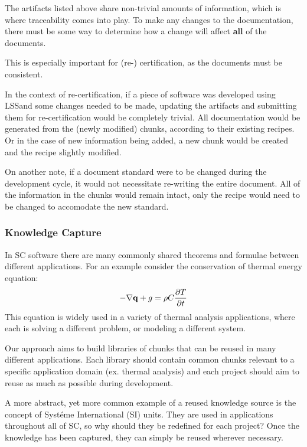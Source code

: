 \documentclass{sig-alternate-05-2015}
\newcommand{\lss}{LSS}
\begin{document}
The artifacts listed above share non-trivial amounts of information, which is
where traceability comes into play. To make any changes to the
documentation, there must be some way to determine how a change will affect
\textbf{all} of the documents.

This is especially important for (re-) certification, as the documents must be 
consistent.

In the context of re-certification, if a piece of software was developed using
\lss and some changes needed to be made, updating the artifacts and submitting
them for re-certification would be completely trivial. All documentation would
be generated from the (newly modified) chunks, according to their existing
recipes. Or in the case of new information being added, a new chunk would be
created and the recipe slightly modified.

On another note, if a document standard were to be changed during the 
development cycle, it would not necessitate re-writing the entire document. All
of the information in the chunks would remain intact, only the recipe 
would need to be changed to accomodate the new standard.

\subsubsection{Knowledge Capture} \label{sssec:adv_knowledge}

In SC software there are many commonly shared theorems and formulae between
different applications. For an example consider the conservation of thermal
energy equation: 
\begin{displaymath} 
-{\bf \nabla q} + g = \rho C \frac{\partial T}{\partial t}
\end{displaymath} 
This
equation is widely used in a variety of thermal analysis applications, where
each is solving a different problem, or modeling a different system.

Our approach aims to build libraries of chunks that can be reused in many
different applications. Each library should contain common chunks relevant to a
specific application domain (ex. thermal analysis) and each project should aim
to reuse as much as possible during development.

A more abstract, yet more common example of a reused knowledge source is the
concept of Syst\'{e}me International (SI) units. They are used in applications
throughout all of SC, so why should they be redefined for each project? Once the
knowledge has been captured, they can simply be reused wherever necessary.
\end{document}
